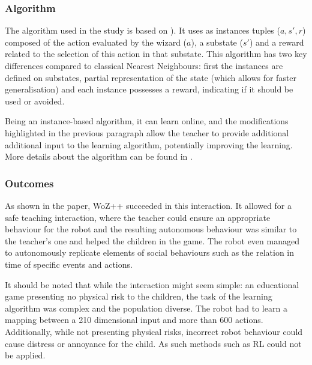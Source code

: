 \documentclass[manuscript, review, anonymous]{acmart}
\newcommand{\woz}{WoZ++\xspace}
\begin{document}
\subsubsection{Algorithm}

The algorithm used in the study is
based on \cite{senft2017toward}). It uses as instances tuples ($a,s',r$)
composed of the action evaluated by the wizard ($a$), a substate ($s'$) and a
reward related to the selection of this action in that substate. This algorithm
has two key differences compared to classical Nearest Neighbours: first the
instances are defined on substates, partial representation of the state (which allows for faster generalisation) 
and each instance possesses a reward, indicating if it should be used or avoided.

Being an instance-based algorithm, it can learn online, and the modifications 
highlighted in the previous paragraph allow the teacher to provide additional 
additional input to the learning algorithm, potentially improving the learning.
More details about the algorithm can be found in \cite{senft2019teaching}.

\subsubsection{Outcomes}

As shown in the paper, \woz succeeded in this interaction. It allowed for a safe
teaching interaction, where the teacher could ensure an appropriate behaviour for the robot
and the resulting autonomous behaviour was similar to the teacher's one and helped the children in the game.
The robot even managed to autonomously replicate elements of social behaviours such as the 
relation in time of specific events and actions.

It should be noted that while the interaction might seem simple: an educational game 
presenting no physical risk to the children, the task of the learning algorithm 
was complex and the population diverse. The robot had to learn a mapping between a
210 dimensional input and more than 600 actions. Additionally, while not presenting 
physical risks, incorrect robot behaviour could cause distress or annoyance for the child.
As such methods such as RL could not be applied.
\end{document}
